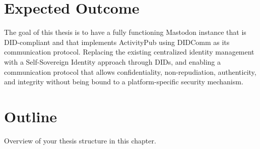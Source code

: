 \section{Expected Outcome}
The goal of this thesis is to have a fully functioning Mastodon instance that is DID-compliant and that implements ActivityPub using DIDComm as its communication protocol. 
Replacing the existing centralized identity management with a Self-Sovereign Identity approach through DIDs, and enabling a communication protocol that allows confidentiality, non-repudiation, authenticity, and integrity without being bound to a platform-specific security mechanism.
 
\section{Outline}
Overview of your thesis structure in this chapter.
